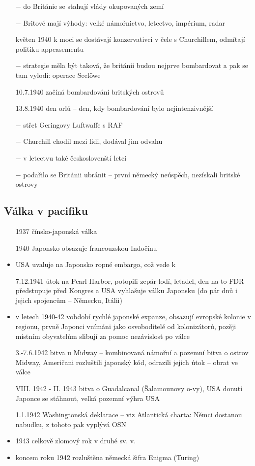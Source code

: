 \documentclass{article}
\begin{document}
\begin{itemize}
    \item[$-$] do Británie se stahují vlády okupovaných zemí
    \item[$-$] Britové mají výhody: velké námořnictvo, letectvo, impérium, radar
    \item[květen 1940] k moci se dostávají
    konzervativci v čele s Churchillem, odmítají politiku appeasementu
    \item[$-$] strategie měla být taková, že británii budou nejprve bombardovat a pak se tam vylodí: operace Seelöwe
    \item[10.7.1940] začíná bombardování britských ostrovů
    \item[13.8.1940] den orlů -- den, kdy bombardování bylo nejintenzivnější
    \item[$-$] střet Geringovy Luftwaffe s RAF
    \item[$-$] Churchill chodil mezi lidi, dodával jim odvahu
    \item[$-$] v letectvu také českoslovenští letci
    \item[$-$] podařilo se Británii ubránit -- první německý neúspěch, nezískali britské ostrovy
\end{itemize}

\subsection*{Válka v pacifiku}
\begin{itemize}
  \item[1937] čínsko-japonská válka
  \item[1940] Japonsko obsazuje francouzskou Indočínu
  \item USA uvaluje na Japonsko ropné embargo, což vede k
  \item[7.12.1941] útok na Pearl Harbor, potopili zepár lodí, letadel, den na to FDR předstupuje před Kongres a USA vyhlašuje válku Japonsku (do pár dnů i jejich spojencům -- Německu, Itálii)
  \item v letech 1940-42 vobdobí rychlé japonské expanze, obsazují evropské kolonie v regionu, prvně Japonci vnímáni jako osvoboditelé od kolonizátorů, pozěji místním obyvatelům slibují za pomoc nezávislost po válce
  \item[3.-7.6.1942] bitva u Midway -- kombinovaná námořní a pozemní bitva o ostrov Midway, Američani rozluštili japonský kód, odrazili jejich útok -- obrat ve válce
  \item[VIII. 1942 - II. 1943] bitva o Guadalcanal (Šalamounovy o-vy), USA donutí Japonce se stáhnout, velká pozemní výhra USA
  \item[1.1.1942] Washingtonská deklarace -- viz Atlantická charta: Němci dostanou nabudku, z tohoto pak vyplývá OSN
  \item 1943 celkově zlomový rok v druhé sv. v.
  \item koncem roku 1942 rozluštěna německá šifra Enigma (Turing)
\end{itemize}
\end{document}

